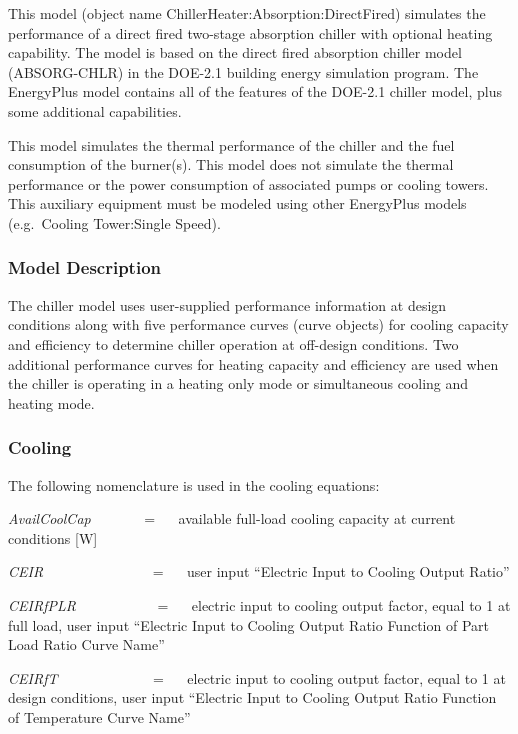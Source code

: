 This model (object name ChillerHeater:Absorption:DirectFired) simulates the performance of a direct fired two-stage absorption chiller with optional heating capability. The model is based on the direct fired absorption chiller model (ABSORG-CHLR) in the DOE-2.1 building energy simulation program. The EnergyPlus model contains all of the features of the DOE-2.1 chiller model, plus some additional capabilities.

This model simulates the thermal performance of the chiller and the fuel consumption of the burner(s). This model does not simulate the thermal performance or the power consumption of associated pumps or cooling towers. This auxiliary equipment must be modeled using other EnergyPlus models (e.g.~Cooling Tower:Single Speed).

\subsubsection{Model Description}\label{model-description-006}

The chiller model uses user-supplied performance information at design conditions along with five performance curves (curve objects) for cooling capacity and efficiency to determine chiller operation at off-design conditions. Two additional performance curves for heating capacity and efficiency are used when the chiller is operating in a heating only mode or simultaneous cooling and heating mode.

\subsubsection{Cooling}\label{cooling}

The following nomenclature is used in the cooling equations:

\emph{AvailCoolCap}~~~~~~~ = ~~ available full-load cooling capacity at current conditions {[}W{]}

\emph{CEIR}~~~~~~~~~~~~~~~ = ~~ user input ``Electric Input to Cooling Output Ratio''

\emph{CEIRfPLR}~~~~~~~~~~~ = ~~ electric input to cooling output factor, equal to 1 at full load, user input ``Electric Input to Cooling Output Ratio Function of Part Load Ratio Curve Name''

\emph{CEIRfT}~~~~~~~~~~~~~ = ~~ electric input to cooling output factor, equal to 1 at design conditions, user input ``Electric Input to Cooling Output Ratio Function of Temperature Curve Name''

